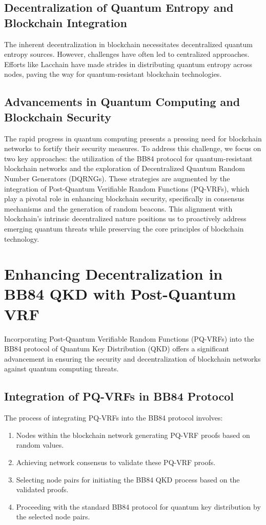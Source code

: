 \documentclass{article}
\begin{document}
\subsection{Decentralization of Quantum Entropy and Blockchain Integration}
The inherent decentralization in blockchain necessitates decentralized quantum entropy sources. However, challenges have often led to centralized approaches. Efforts like Lacchain have made strides in distributing quantum entropy across nodes, paving the way for quantum-resistant blockchain technologies.

\subsection{Advancements in Quantum Computing and Blockchain Security}
The rapid progress in quantum computing presents a pressing need for blockchain networks to fortify their security measures. To address this challenge, we focus on two key approaches: the utilization of the BB84 protocol for quantum-resistant blockchain networks and the exploration of Decentralized Quantum Random Number Generators (DQRNGs). These strategies are augmented by the integration of Post-Quantum Verifiable Random Functions (PQ-VRFs), which play a pivotal role in enhancing blockchain security, specifically in consensus mechanisms and the generation of random beacons. This alignment with blockchain’s intrinsic decentralized nature positions us to proactively address emerging quantum threats while preserving the core principles of blockchain technology.

\section{Enhancing Decentralization in BB84 QKD with Post-Quantum VRF}
Incorporating Post-Quantum Verifiable Random Functions (PQ-VRFs) into the BB84 protocol of Quantum Key Distribution (QKD) offers a significant advancement in ensuring the security and decentralization of blockchain networks against quantum computing threats.

\subsection{Integration of PQ-VRFs in BB84 Protocol}
The process of integrating PQ-VRFs into the BB84 protocol involves:
\begin{enumerate}
    \item Nodes within the blockchain network generating PQ-VRF proofs based on random values.
    \item Achieving network consensus to validate these PQ-VRF proofs.
    \item Selecting node pairs for initiating the BB84 QKD process based on the validated proofs.
    \item Proceeding with the standard BB84 protocol for quantum key distribution by the selected node pairs.
\end{enumerate}
\end{document}
